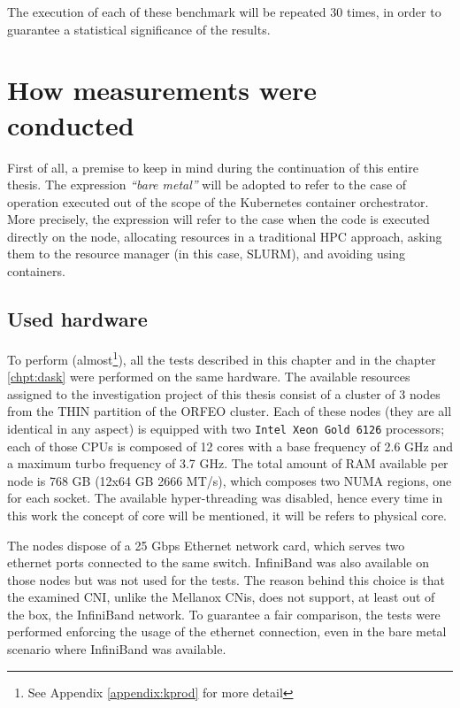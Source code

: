The execution of each of these benchmark will be repeated 30 times, in order to
guarantee a statistical significance of the results.

\section{How measurements were conducted}\label{sec:measurements}

First of all, a premise to keep in mind during the continuation of this entire
thesis. The expression \textit{``bare metal''} will be adopted to refer to the
case of operation executed out of the scope of the Kubernetes container
orchestrator. More precisely, the expression will refer to the case when the
code is executed directly on the node, allocating resources in a traditional HPC
approach, asking them to the resource manager (in this case, SLURM), and
avoiding using containers.

\subsection{Used hardware}\label{subsec:hardware}

To perform (almost\footnote{See Appendix \ref{appendix:kprod} for more detail}),
all the tests described in this chapter and in the chapter \ref{chpt:dask} were
performed on the same hardware.
The available resources assigned to the investigation project of this thesis
consist of a cluster of 3 nodes from the THIN partition of the ORFEO cluster.
Each of these nodes (they are all identical in any aspect) is equipped with two
\texttt{Intel Xeon Gold 6126} processors; each of those CPUs is composed of 12
cores with a base frequency of 2.6 GHz and a maximum turbo frequency of 3.7 GHz.
The total amount of RAM available per node is 768 GB (12x64 GB 2666 MT/s), which
composes two NUMA regions, one for each socket. The available hyper-threading
was disabled, hence every time in this work the concept of core will be
mentioned, it will be refers to physical core.

The nodes dispose of a 25 Gbps Ethernet network card, which serves two ethernet
ports connected to the same switch. InfiniBand was also available on those nodes
but was not used for the tests.
The reason behind this choice is that the examined CNI, unlike the Mellanox
CNis, does not support, at least out of the box, the InfiniBand network. To
guarantee a fair comparison, the tests were performed enforcing the usage of the
ethernet connection, even in the bare metal scenario where InfiniBand was
available.


